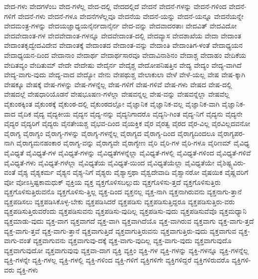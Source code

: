 {ವೇದ-ಗಳು
ವೇದಗಳೆಂಬ
ವೇದ-ಗಳೆಲ್ಲ
ವೇದ-ದಲ್ಲಿ
ವೇದದಲ್ಲಿದೆ
ವೇದನೆ
ವೇದನೆ-ಗಳನ್ನು
ವೇದನೆ-ಗಳಿಂದ
ವೇದನೆ-ಗಳಿಗೆ
ವೇದನೆ-ಗಳು
ವೇದನೆ-ಗಳೂ
ವೇದನೆಗಳೆಲ್ಲವೂ
ವೇದನೆಯ
ವೇದನೆ-ಯನ್ನು
ವೇದನೆ-ಯನ್ನೂ
ವೇದನೆಯನ್ನೇ
ವೇದಮಂತ್ರ-ಗಳನ್ನು
ವೇದಯಜ್ಞಾಧ್ಯಯನೈರ್ನದಾನೈರ್ನ
ವೇದ-ವನ್ನು
ವೇದವಾದರತಾಃ
ವೇದವಿತ್
ವೇದವಿದೋ
ವೇದವೇದಾಂತ-ಗಳ
ವೇದವೇದಾಂತ-ಗಳನ್ನೂ
ವೇದವೇದಾಂತ-ದಲ್ಲಿ
ವೇದವ್ಯಾಸ
ವೇದಶಾಖೆಯ
ವೇದಾ
ವೇದಾಂತ
ವೇದಾಂತಕೃದ್ವೇದವಿದೇವ
ವೇದಾಂತಕ್ಕೆ
ವೇದಾಂತದ
ವೇದಾಂತ-ವನ್ನು
ವೇದಾಂತಿ
ವೇದಾಂತಿಗ-ಳಂತೆ
ವೇದಾಧ್ಯಯನ
ವೇದಾಧ್ಯಯನ-ದಿಂದ
ವೇದಾನಾಂ
ವೇದಾರ್ಥ
ವೇದಾರ್ಥಸಾರವೂ
ವೇದಾವಿನಾಶಿನಂ
ವೇದಾಶ್ಚ
ವೇದಾಹಂ
ವೇದಿಕೆಯ
ವೇದಿತವ್ಯಂ
ವೇದಿತುಮ್
ವೇದೇ
ವೇದೇಷು
ವೇದೈರ್ನ
ವೇದೈಶ್ಚ
ವೇದೋಪನಿಷತ್ತಿನ
ವೇದ್ಯ
ವೇದ್ಯಂ
ವೇದ್ಯ-ವಾಗಿದೆ
ವೇದ್ಯ-ವಾಗು-ವುದು
ವೇದ್ಯ-ವಾದ
ವೇದ್ಯೋ
ವೇನು
ವೇಪಥುಶ್ಚ
ವೇಲಾಕುಲಾ
ವೇಳೆ
ವೇಳೆ-ಯಲ್ಲ
ವೇಷ
ವೇಷ-ಕ್ಕಾಗಿ
ವೇಷಕ್ಕೂ
ವೇಷಕ್ಕೆ
ವೇಷ-ಗಳನ್ನು
ವೇಷ-ಗಳನ್ನೆಲ್ಲ
ವೇಷ-ಗಳಿಗೆ
ವೇಷ-ಗಳಿವೆ
ವೇಷ-ಗಳು
ವೇಷದ
ವೇಷ-ದಲ್ಲಿ
ವೇಷದಲ್ಲೆ
ವೇಷಧಾರಿಯೊಡನೆ
ವೇಷಭೂಷಣ-ಗಳೆಲ್ಲಾ
ವೇಷವನ್ನಲ್ಲ
ವೇಷ-ವನ್ನು
ವೇಷವನ್ನೆಲ್ಲಾ
ವೇಷವೆಲ್ಲ
ವೈಕುಂಠಕ್ಕಿಂತ
ವೈಕುಂಠಕ್ಕೆ
ವೈಕುಂಠ-ದಲ್ಲಿ
ವೈಕುಂಠದಲ್ಲೋ
ವೈಜ್ಞಾನಿಕ
ವೈಜ್ಞಾನಿಕ-ವಲ್ಲ
ವೈಜ್ಞಾನಿಕ-ವಾಗಿ
ವೈಜ್ಞಾನಿಕ-ವಾದ
ವೈದಿಕ
ವೈದ್ಯ
ವೈದ್ಯಕೀಯ
ವೈದ್ಯನ
ವೈದ್ಯ-ನನ್ನು
ವೈದ್ಯನಿಗಾದರೊ
ವೈದ್ಯನಿ-ಗಿಂತ
ವೈದ್ಯ-ನಿಗೆ
ವೈದ್ಯನು
ವೈದ್ಯನೇ
ವೈದ್ಯರ
ವೈದ್ಯರಿಗೆ
ವೈದ್ಯರು
ವೈನತೇಯಶ್ಚ
ವೈಭವ-ದಿಂದ
ವೈಯಕ್ತಿಕ
ವೈರ
ವೈರತ್ವ
ವೈರದ
ವೈರ-ವಿಲ್ಲ
ವೈರವಿಲ್ಲದವನೋ
ವೈರಾಗ್ಯ
ವೈರಾಗ್ಯಂ
ವೈರಾಗ್ಯ-ಗಳನ್ನು
ವೈರಾಗ್ಯ-ಗಳನ್ನೆಲ್ಲ
ವೈರಾಗ್ಯದ
ವೈರಾಗ್ಯ-ದಿಂದ
ವೈರಾಗ್ಯದಿಂದಲೂ
ವೈರಾಗ್ಯಪರ-ನಾಗಿ
ವೈರಾಗ್ಯಮನಹಂಕಾರ
ವೈರಾಗ್ಯ-ವನ್ನು
ವೈರಾಗ್ಯವೇ
ವೈರಾಗ್ಯೇಣ
ವೈರಿ
ವೈರಿ-ಗಳ
ವೈರಿ-ಗಳೂ
ವೈರಿಣಮ್
ವೈವಿಧ್ಯ
ವೈವಿಧ್ಯತೆ
ವೈವಿಧ್ಯತೆ-ಗಳ
ವೈವಿಧ್ಯತೆ-ಗಳನ್ನು
ವೈವಿಧ್ಯತೆಗಳನ್ನೆಲ್ಲಾ
ವೈವಿಧ್ಯತೆ-ಗಳಲ್ಲಿ
ವೈವಿಧ್ಯತೆ-ಗಳಿಂದ
ವೈವಿಧ್ಯತೆ-ಗಳಿವೆ
ವೈವಿಧ್ಯತೆ-ಗಳು
ವೈವಿಧ್ಯತೆ-ಗಳೆಲ್ಲಾ
ವೈವಿಧ್ಯತೆಯ
ವೈವಿಧ್ಯತೆ-ಯಿಂದ
ವೈವಿಧ್ಯತೆಯೆಲ್ಲಾ
ವೈವಿಧ್ಯತೆಯೇ
ವೈಶಿಷ್ಟ್ಯವಿರು-ವಂತೆ
ವೈಶ್ಯ
ವೈಶ್ಯಕರ್ಮ
ವೈಶ್ಯನ
ವೈಶ್ಯ-ನಿಗೆ
ವೈಶ್ಯರು
ವೈಶ್ಯಾಸ್ತಥಾ
ವೈಶ್ವದೇವಾದಿ
ವೈಶ್ವಾನರೋ
ವೈಷಯಿಕ
ವೈಷ್ಣವರಿಗೆ
ವೋ
ವೋಽಸ್ತಿಷ್ಟಕಾಮಧುಕ್
ವ್ಟಕ್ತಿಯ
ವ್ಯಕ್ತ
ವ್ಯಕ್ತಗೊಳಿಸಬಲ್ಲುದು
ವ್ಯಕ್ತಗೊಳಿಸು-ತ್ತದೆ
ವ್ಯಕ್ತಗೊಳಿಸುತ್ತಿರು
ವ್ಯಕ್ತಗೊಳಿಸುತ್ತಿರುವನೊ
ವ್ಯಕ್ತಗೊಳಿಸು-ತ್ತಿಲ್ಲ
ವ್ಯಕ್ತ-ದಿಂದ
ವ್ಯಕ್ತನಲ್ಲ
ವ್ಯಕ್ತ-ನಾಗಿ
ವ್ಯಕ್ತನಾಗಿರುವನು
ವ್ಯಕ್ತನಾಗು-ತ್ತಾನೆ
ವ್ಯಕ್ತಪಡಿಸಲು
ವ್ಯಕ್ತಪಡಿಸಿಕೊಳ್ಳ-ಬೇಕು
ವ್ಯಕ್ತಪಡಿಸಿದರೆ
ವ್ಯಕ್ತಪಡಿಸು
ವ್ಯಕ್ತಪಡಿಸುತ್ತಿದ್ದರೂ
ವ್ಯಕ್ತಪಡಿಸುತ್ತಿರು-ವರು
ವ್ಯಕ್ತಪಡಿಸುತ್ತಿರುವರೆಂದು
ವ್ಯಕ್ತಪಡಿಸುವನು
ವ್ಯಕ್ತಪಡಿಸು-ವುದಿಲ್ಲ
ವ್ಯಕ್ತಪಡಿಸು-ವುದು
ವ್ಯಕ್ತಪಡಿಸುವೆವೊ
ವ್ಯಕ್ತಮಧ್ಯಾನಿ
ವ್ಯಕ್ತಮಾಡು-ವುದು
ವ್ಯಕ್ತ-ವಾಗ
ವ್ಯಕ್ತವಾಗದೆ
ವ್ಯಕ್ತ-ವಾಗಿ
ವ್ಯಕ್ತವಾಗಿದೆಯೊ
ವ್ಯಕ್ತ-ವಾಗಿರುವ
ವ್ಯಕ್ತವಾಗು
ವ್ಯಕ್ತ-ವಾಗು-ತ್ತದೆ
ವ್ಯಕ್ತ-ವಾಗು-ತ್ತವೆ
ವ್ಯಕ್ತ-ವಾಗು-ತ್ತಾನೆ
ವ್ಯಕ್ತವಾಗುತ್ತಿದೆ
ವ್ಯಕ್ತವಾಗುತ್ತಿರುವನು
ವ್ಯಕ್ತವಾಗುತ್ತಿರು-ವುದು
ವ್ಯಕ್ತವಾಗುವ
ವ್ಯಕ್ತ-ವಾಗು-ವಂತೆ
ವ್ಯಕ್ತವಾಗುವನು
ವ್ಯಕ್ತವಾಗುವು-ದಕ್ಕೆ
ವ್ಯಕ್ತ-ವಾಗು-ವುದಿಲ್ಲ
ವ್ಯಕ್ತ-ವಾಗು-ವುದು
ವ್ಯಕ್ತವಾಗುವುದೊ
ವ್ಯಕ್ತವಾಗುವುದೋ
ವ್ಯಕ್ತವಾಗುವುವು
ವ್ಯಕ್ತವಾ-ದಾಗ
ವ್ಯಕ್ತಿ
ವ್ಯಕ್ತಿಂ
ವ್ಯಕ್ತಿ-ಗಳ
ವ್ಯಕ್ತಿ-ಗಳನ್ನು
ವ್ಯಕ್ತಿ-ಗಳನ್ನೂ
ವ್ಯಕ್ತಿ-ಗಳನ್ನೆಲ್ಲ
ವ್ಯಕ್ತಿ-ಗಳನ್ನೇ
ವ್ಯಕ್ತಿ-ಗಳಲ್ಲ
ವ್ಯಕ್ತಿ-ಗಳಲ್ಲಿ
ವ್ಯಕ್ತಿ-ಗಳಿಂದ
ವ್ಯಕ್ತಿ-ಗಳಿಗೆ
ವ್ಯಕ್ತಿಗಳಿಗೇ
ವ್ಯಕ್ತಿಗಳಿದ್ದರೆ
ವ್ಯಕ್ತಿಗಳಿರುವರೊ
ವ್ಯಕ್ತಿಗಳಿ-ವರು
ವ್ಯಕ್ತಿ-ಗಳು
}
